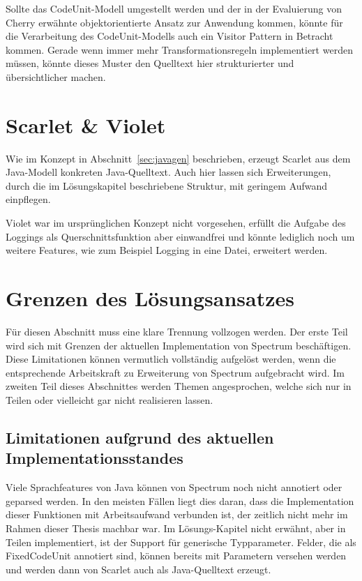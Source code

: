 \documentclass[12pt,oneside,a4paper,parskip]{scrbook}
\begin{document}
Sollte das CodeUnit-Modell umgestellt werden und der in der Evaluierung von Cherry erwähnte objektorientierte Ansatz zur Anwendung kommen, könnte für die Verarbeitung des CodeUnit-Modells auch ein Visitor Pattern in Betracht kommen. Gerade wenn immer mehr Transformationsregeln implementiert werden müssen, könnte dieses Muster den Quelltext hier strukturierter und übersichtlicher machen.

\section{Scarlet \& Violet}

Wie im Konzept in Abschnitt~\ref{sec:javagen} beschrieben, erzeugt Scarlet aus dem Java-Modell konkreten Java-Quelltext. Auch hier lassen sich Erweiterungen, durch die im Lösungskapitel beschriebene Struktur, mit geringem Aufwand einpflegen.

Violet war im ursprünglichen Konzept nicht vorgesehen, erfüllt die Aufgabe des Loggings als Querschnittsfunktion aber einwandfrei und könnte lediglich noch um weitere Features, wie zum Beispiel Logging in eine Datei, erweitert werden.

\section{Grenzen des Lösungsansatzes}

Für diesen Abschnitt muss eine klare Trennung vollzogen werden. Der erste Teil wird sich mit Grenzen der aktuellen Implementation von Spectrum beschäftigen. Diese Limitationen können vermutlich vollständig aufgelöst werden, wenn die entsprechende Arbeitskraft zu Erweiterung von Spectrum aufgebracht wird. Im zweiten Teil dieses Abschnittes werden Themen angesprochen, welche sich nur in Teilen oder vielleicht gar nicht realisieren lassen.

\subsection{Limitationen aufgrund des aktuellen Implementationsstandes}

Viele Sprachfeatures von Java können von Spectrum noch nicht annotiert oder geparsed werden. In den meisten Fällen liegt dies daran, dass die Implementation dieser Funktionen mit Arbeitsaufwand verbunden ist, der zeitlich nicht mehr im Rahmen dieser Thesis machbar war. Im Lösungs-Kapitel nicht erwähnt, aber in Teilen implementiert, ist der Support für generische Typparameter. Felder, die als FixedCodeUnit annotiert sind, können bereits mit Parametern versehen werden und werden dann von Scarlet auch als Java-Quelltext erzeugt.
\end{document}
